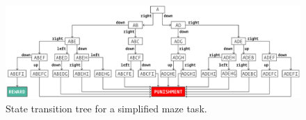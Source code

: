\begin{figure}[hb!]
\caption{State transition tree for a simplified maze task.}
\label{fig:fsmtree}
\includegraphics[]{figures/maze.pdf}
\end{figure}